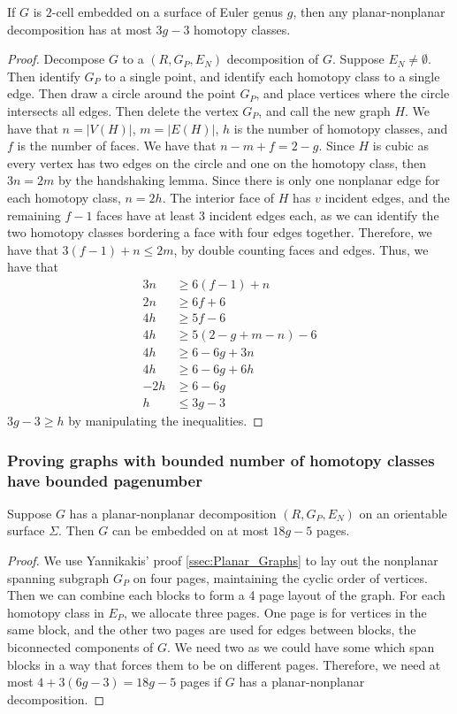 \begin{lemma}
	If $G$ is $2$-cell embedded on a surface of Euler genus $g$, then any planar-nonplanar decomposition has at most $3g-3$ homotopy classes. 
\end{lemma}
\begin{proof}
	Decompose $G$ to a $(R, G_P, E_N)$ decomposition of $G$. Suppose $E_N \neq \emptyset$. Then identify $G_P$ to a single point, and identify each homotopy class to a single edge. Then draw a circle around the point $G_P$, and place vertices where the circle intersects all edges. Then delete the vertex $G_P$, and call the new graph $H$. We have that $n = |V(H)|$, $m = |E(H)|$, $h$ is the number of homotopy classes, and $f$ is the number of faces. We have that $n - m + f = 2 - g$. Since $H$ is cubic as every vertex has two edges on the circle and one on the homotopy class, then $3n = 2m$ by the handshaking lemma. Since there is only one nonplanar edge for each homotopy class, $n = 2h$. The interior face of $H$ has $v$ incident edges, and the remaining $f-1$ faces have at least 3 incident edges each, as we can identify the two homotopy classes bordering a face with four edges together. Therefore, we have that $3(f-1) + n \leq 2m$, by double counting faces and edges. Thus, we have that
	\begin{align*}
		3n &\geq 6(f - 1) + n\\
		2n &\geq 6f + 6\\
		4h &\geq 5 f - 6\\
		4h &\geq 5(2 - g + m - n) - 6\\
		4h &\geq 6 - 6g + 3n\\
		4h &\geq 6 - 6g + 6h\\
		-2h &\geq 6 - 6g\\
		h &\leq 3g - 3
	\end{align*}
	$3g - 3 \geq h$ by manipulating the inequalities. 
\end{proof}

\subsubsection{Proving graphs with bounded number of homotopy classes have bounded pagenumber}\label{sssec:bounded_pagenumber_homotopy}
\begin{lemma}\label{lem:planar_nonplanar_orientable}
	Suppose $G$ has a planar-nonplanar decomposition $(R, G_P, E_N)$ on an orientable surface $\Sigma$. Then $G$ can be embedded on at most $18g - 5$ pages.
\end{lemma}
\begin{proof}
	We use Yannikakis' proof \cref{ssec:Planar_Graphs} to lay out the nonplanar spanning subgraph $G_P$ on four pages, maintaining the cyclic order of vertices. Then we can combine each blocks to form a 4 page layout of the graph. For each homotopy class in $E_P$, we allocate three pages. One page is for vertices in the same block, and the other two pages are used for edges between blocks, the biconnected components of $G$. We need two as we could have some which span blocks in a way that forces them to be on different pages. Therefore, we need at most $4 + 3(6g - 3) = 18g-5$ pages if $G$ has a planar-nonplanar decomposition. 
\end{proof}

